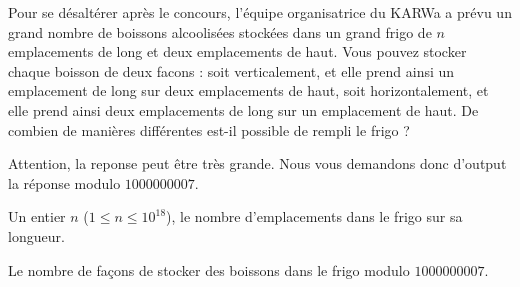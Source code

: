 \problemname{\problemyamlname}


Pour se désaltérer après le concours, l'équipe organisatrice du KARWa a prévu un grand
nombre de boissons alcoolisées stockées dans un grand frigo de $n$ emplacements
de long et deux emplacements de haut. Vous pouvez stocker chaque boisson de
deux facons : soit verticalement, et elle prend ainsi un emplacement de long sur
deux emplacements de haut, soit horizontalement, et elle prend ainsi deux
emplacements de long sur un emplacement de haut. De combien de manières
différentes est-il possible de rempli le frigo ? 

Attention, la reponse peut être très grande. Nous vous demandons donc d'output
la réponse modulo $1000000007$.

\begin{Input}
	Un entier $n$ ($1 \le n \le 10^18$), le nombre d'emplacements dans le frigo sur sa longueur.
\end{Input}

\begin{Output}
	Le nombre de façons de stocker des boissons dans le frigo modulo $1000000007$.
\end{Output}
